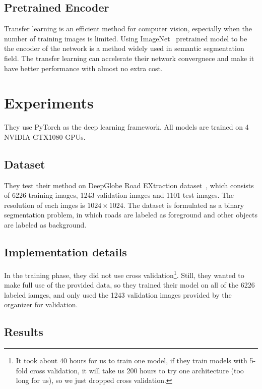 \documentclass[10pt,twocolumn,letterpaper]{article}
\begin{document}
\subsection{Pretrained Encoder}

Transfer learning is an efficient method for computer vision, especially when the number of training images is limited. Using ImageNet~\cite{23} pretrained model to be the encoder of the network is a method widely used in semantic segmentation field. The transfer learning can accelerate their network convergnece and make it have better performance with almost no extra cost.

\section{Experiments}

They use PyTorch as the deep learning framework. All models are trained on 4 NVIDIA GTX1080 GPUs.

\subsection{Dataset}

They test their method on DeepGlobe Road EXtraction dataset~\cite{7}, which consists of 6226 training images, 1243 validation images and 1101 test images. The resolution of each imges is $1024\times 1024$. The dataset is formulated as a binary segmentation problem, in which roads are labeled as foreground and other objects are labeled as background.

\subsection{Implementation details}

In the training phase, they did not use cross validation\footnote{It took about 40 hours for us to train one model, if they train models with 5-fold cross validation, it will take us 200 hours to try one architecture (too long for us), so we just dropped cross validation.}. Still, they wanted to make full use of the provided data, so they trained their model on all of the 6226 labeled iamges, and only used the 1243 validation images provided by the organizer for validation.

\subsection{Results}
\end{document}
